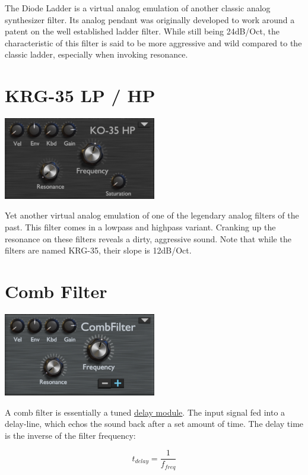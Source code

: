 The Diode Ladder is a virtual analog emulation of another classic analog synthesizer filter. Its analog pendant was originally developed to work around a patent on the well established ladder filter. While still being 24dB/Oct, the characteristic of this filter is said to be more aggressive and wild compared to the classic ladder, especially when invoking resonance.

\section{KRG-35 LP / HP}
\begin{center}
    \includegraphics[width=0.5\textwidth]{graphics/korg_filter.png}
\end{center}

Yet another virtual analog emulation of one of the legendary analog filters of the past. This filter comes in a lowpass and highpass variant. Cranking up the resonance on these filters reveals a dirty, aggressive sound. Note that while the filters are named KRG-35, their slope is 12dB/Oct.

\section{Comb Filter}
\label{comb_filter}
\begin{center}
    \includegraphics[width=0.5\textwidth]{graphics/comb_filter.png}
\end{center}

A comb filter is essentially a tuned \hyperref[delay]{delay module}. The input signal fed into a delay-line, which echos the sound back after a set amount of time. The delay time is the inverse of the filter frequency:

\begin{equation}
    t_{delay} = \frac{1}{f_{freq}}
\end{equation}


